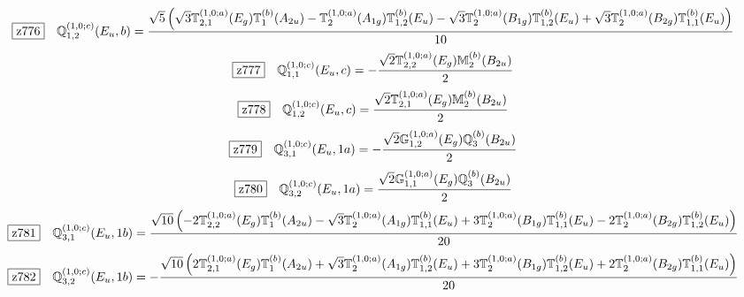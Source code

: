 \documentclass[fleqn,10pt,landscape]{jsarticle}
\begin{document}
\begin{dmath*}
\hspace*{3mm}\fbox{z776}\quad \mathbb{Q}_{1,2}^{(1,0;c)}(E_{u},b)=\frac{\sqrt{5} \left(\sqrt{3} \mathbb{T}_{2,1}^{(1,0;a)}(E_{g}) \mathbb{T}_{1}^{(b)}(A_{2u}) - \mathbb{T}_{2}^{(1,0;a)}(A_{1g}) \mathbb{T}_{1,2}^{(b)}(E_{u}) - \sqrt{3} \mathbb{T}_{2}^{(1,0;a)}(B_{1g}) \mathbb{T}_{1,2}^{(b)}(E_{u}) + \sqrt{3} \mathbb{T}_{2}^{(1,0;a)}(B_{2g}) \mathbb{T}_{1,1}^{(b)}(E_{u})\right)}{10}
\end{dmath*}
\begin{dmath*}
\hspace*{3mm}\fbox{z777}\quad \mathbb{Q}_{1,1}^{(1,0;c)}(E_{u},c)=- \frac{\sqrt{2} \mathbb{T}_{2,2}^{(1,0;a)}(E_{g}) \mathbb{M}_{2}^{(b)}(B_{2u})}{2}
\end{dmath*}
\begin{dmath*}
\hspace*{3mm}\fbox{z778}\quad \mathbb{Q}_{1,2}^{(1,0;c)}(E_{u},c)=\frac{\sqrt{2} \mathbb{T}_{2,1}^{(1,0;a)}(E_{g}) \mathbb{M}_{2}^{(b)}(B_{2u})}{2}
\end{dmath*}
\begin{dmath*}
\hspace*{3mm}\fbox{z779}\quad \mathbb{Q}_{3,1}^{(1,0;c)}(E_{u},1a)=- \frac{\sqrt{2} \mathbb{G}_{1,2}^{(1,0;a)}(E_{g}) \mathbb{Q}_{3}^{(b)}(B_{2u})}{2}
\end{dmath*}
\begin{dmath*}
\hspace*{3mm}\fbox{z780}\quad \mathbb{Q}_{3,2}^{(1,0;c)}(E_{u},1a)=\frac{\sqrt{2} \mathbb{G}_{1,1}^{(1,0;a)}(E_{g}) \mathbb{Q}_{3}^{(b)}(B_{2u})}{2}
\end{dmath*}
\begin{dmath*}
\hspace*{3mm}\fbox{z781}\quad \mathbb{Q}_{3,1}^{(1,0;c)}(E_{u},1b)=\frac{\sqrt{10} \left(- 2 \mathbb{T}_{2,2}^{(1,0;a)}(E_{g}) \mathbb{T}_{1}^{(b)}(A_{2u}) - \sqrt{3} \mathbb{T}_{2}^{(1,0;a)}(A_{1g}) \mathbb{T}_{1,1}^{(b)}(E_{u}) + 3 \mathbb{T}_{2}^{(1,0;a)}(B_{1g}) \mathbb{T}_{1,1}^{(b)}(E_{u}) - 2 \mathbb{T}_{2}^{(1,0;a)}(B_{2g}) \mathbb{T}_{1,2}^{(b)}(E_{u})\right)}{20}
\end{dmath*}
\begin{dmath*}
\hspace*{3mm}\fbox{z782}\quad \mathbb{Q}_{3,2}^{(1,0;c)}(E_{u},1b)=- \frac{\sqrt{10} \left(2 \mathbb{T}_{2,1}^{(1,0;a)}(E_{g}) \mathbb{T}_{1}^{(b)}(A_{2u}) + \sqrt{3} \mathbb{T}_{2}^{(1,0;a)}(A_{1g}) \mathbb{T}_{1,2}^{(b)}(E_{u}) + 3 \mathbb{T}_{2}^{(1,0;a)}(B_{1g}) \mathbb{T}_{1,2}^{(b)}(E_{u}) + 2 \mathbb{T}_{2}^{(1,0;a)}(B_{2g}) \mathbb{T}_{1,1}^{(b)}(E_{u})\right)}{20}
\end{dmath*}
\end{document}
